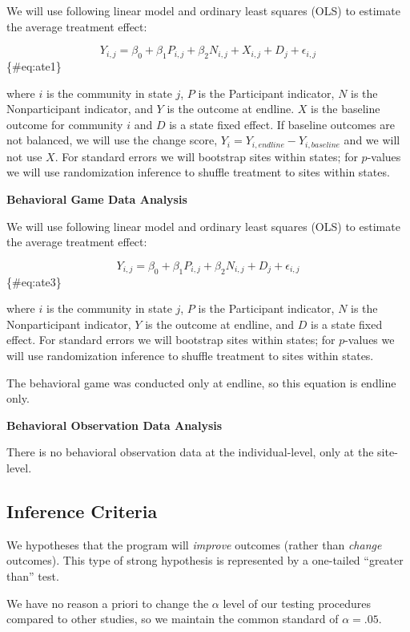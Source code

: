 \documentclass[
]{article}
\begin{document}
We will use following linear model and ordinary least squares (OLS) to
estimate the average treatment effect:

\[ Y_{i,j} = \beta_0 + \beta_1 P_{i,j} + \beta_2 N_{i,j} + X_{i,j} + D_{j} + \epsilon_{i,j} \]\{\#eq:ate1\}

where \(i\) is the community in state \(j\), \(P\) is the Participant
indicator, \(N\) is the Nonparticipant indicator, and \(Y\) is the
outcome at endline. \(X\) is the baseline outcome for community \(i\)
and \(D\) is a state fixed effect. If baseline outcomes are not
balanced, we will use the change score,
\(Y_i = Y_{i,endline} - Y_{i,baseline}\) and we will not use \(X\). For
standard errors we will bootstrap sites within states; for \(p\)-values
we will use randomization inference to shuffle treatment to sites within
states.

\textbf{Behavioral Game Data Analysis}

We will use following linear model and ordinary least squares (OLS) to
estimate the average treatment effect:

\[ Y_{i,j} = \beta_0 + \beta_1 P_{i,j} + \beta_2 N_{i,j} + D_{j} + \epsilon_{i,j} \]\{\#eq:ate3\}

where \(i\) is the community in state \(j\), \(P\) is the Participant
indicator, \(N\) is the Nonparticipant indicator, \(Y\) is the outcome
at endline, and \(D\) is a state fixed effect. For standard errors we
will bootstrap sites within states; for \(p\)-values we will use
randomization inference to shuffle treatment to sites within states.

The behavioral game was conducted only at endline, so this equation is
endline only.

\textbf{Behavioral Observation Data Analysis}

There is no behavioral observation data at the individual-level, only at
the site-level.

\hypertarget{inference-criteria}{%
\subsection{Inference Criteria}\label{inference-criteria}}

We hypotheses that the program will \emph{improve} outcomes (rather than
\emph{change} outcomes). This type of strong hypothesis is represented
by a one-tailed ``greater than'' test.

We have no reason a priori to change the \(\alpha\) level of our testing
procedures compared to other studies, so we maintain the common standard
of \(\alpha=.05\).
\end{document}
